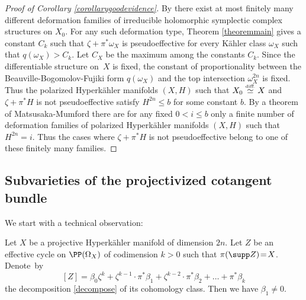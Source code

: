\begin{proof}[Proof of Corollary \ref{corollarygoodevidence}]
By \cite[Th.\,2.1]{Huy03b} there exist at most finitely many
different deformation families of irreducible holomorphic symplectic complex structures on $X_0$.
For any such deformation type, Theorem \ref{theoremmain} gives a constant $C_k$ such that $\zeta + \pi^* \omega_{X}$ is pseudoeffective for every Kähler class $\omega_X$ such that $q(\omega_{X})>C_k$. Let $C_X$ be the maximum among the constants $C_k$. Since the differentiable structure on~$X$ is fixed, the constant of proportionality between the Beauville-Bogomolov-Fujiki form $q(\omega_X)$ and the top intersection $\omega_X^{2n}$ is fixed.
Thus the polarized Hyperkähler manifolds $(X, H)$ such that
$X_0 \stackrel{\mbox{\tiny diff.}}{\simeq} X$ and $\zeta + \pi^* H$ is not pseudoeffective satisfy $H^{2n} \leq b$
for some constant $b$. By a theorem of Matsusaka-Mumford \cite{MM64}
there are for any fixed $0 < i\leq b$ only a finite number of deformation families
of polarized Hyperkähler manifolds $(X, H)$ such that $H^{2n}=i$.
Thus the cases where $\zeta + \pi^* H$ is not pseudoeffective belong to one of these finitely many families.
\end{proof}

\subsection{Subvarieties of the projectivized cotangent bundle} \label{subsectionsubvarieties}

We start with a technical observation:

\begin{lemma} \label{lemmakey}
Let $X$ be a projective Hyperkähler manifold of dimension $2n$.
Let $Z$ be an effective cycle on $\PP(\Omega_X)$
of codimension $k\!>\!0$ such that $\pi(\supp Z)\!=\! X$. Denote~by
\[
[Z]= \beta_0 \zeta^k + \zeta^{k-1}\cdot \pi^* \beta_1 + \zeta^{k-2}\cdot \pi^* \beta_2 + \ldots + \pi^* \beta_k
\]
the decomposition \eqref{decompose} of its cohomology class. Then we have $\beta_1 \neq 0$.
\end{lemma}

